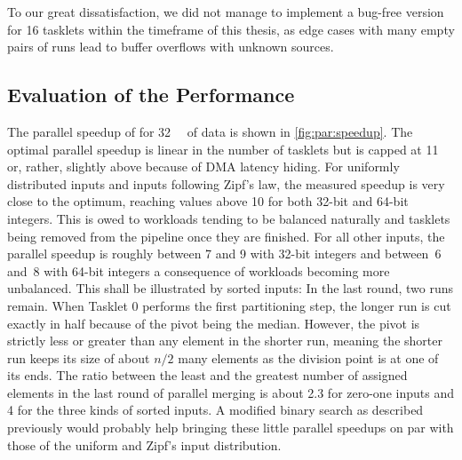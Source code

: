 To our great dissatisfaction, we did not manage to implement a bug-free version for 16 tasklets within the timeframe of this thesis, as edge cases with many empty pairs of runs lead to buffer overflows with unknown sources.



\subsection{Evaluation of the Performance}

The parallel speedup of \MS{} for \qty{32}{\mebi\byte} of data is shown in \cref{fig:par:speedup}.
The optimal parallel speedup is linear in the number of tasklets but is capped at 11 or, rather, slightly above because of \ac{DMA} latency hiding.
For uniformly distributed inputs and inputs following Zipf's law, the measured speedup is very close to the optimum, reaching values above 10 for both 32-bit and 64-bit integers.
This is owed to workloads tending to be balanced naturally and tasklets being removed from the pipeline once they are finished.
For all other inputs, the parallel speedup is roughly between 7 and 9 with 32-bit integers and between~6 and~8 with 64-bit integers \Dash a consequence of workloads becoming more unbalanced.
This shall be illustrated by sorted inputs:
In the last round, two runs remain.
When Tasklet 0 performs the first partitioning step, the longer run is cut exactly in half because of the pivot being the median.
However, the pivot is strictly less or greater than any element in the shorter run, meaning the shorter run keeps its size of about \(n/2\) many elements as the division point is at one of its ends.
The ratio between the least and the greatest number of assigned elements in the last round of parallel merging is about 2.3 for zero-one inputs and 4 for the three kinds of sorted inputs.
A modified binary search as described previously would probably help bringing these little parallel speedups on par with those of the uniform and Zipf's input distribution.


